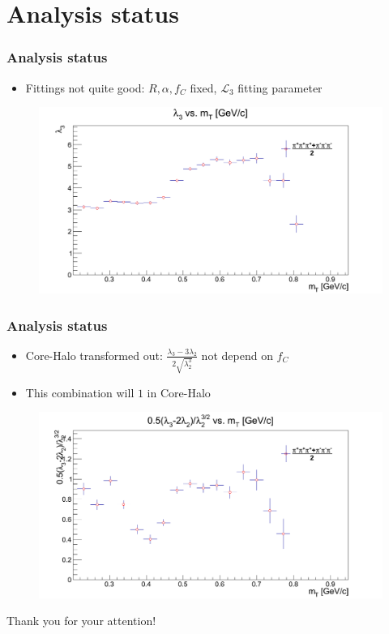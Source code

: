 \documentclass{beamer}
\begin{document}
\section{Analysis status}

\begin{frame}
\frametitle{Analysis status}
\begin{itemize}
\item Fittings not quite good: $R, \alpha, f_C$ fixed, $\mathcal{L}_3$ fitting parameter
\end{itemize}
\begin{figure}
\includegraphics[scale=0.27]{pic/l3_n}
\end{figure}
\end{frame}

\begin{frame}
\frametitle{Analysis status}
\begin{itemize}
\item Core-Halo transformed out: $\frac{\lambda_3-3\lambda_2}{2\sqrt{\lambda_2^3}}$ not depend on $f_C$
\item This combination will $1$ in Core-Halo
\end{itemize}
\begin{figure}
\includegraphics[scale=0.25]{pic/l4_n}
\end{figure}
\end{frame}


\begin{frame}
\begin{center}
\Huge{Thank you for your attention!}
\end{center}
\end{frame}
\end{document}
